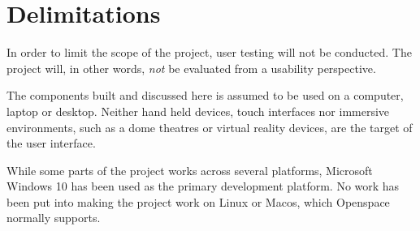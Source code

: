

\section{Delimitations}
\label{sec:delimitations}


In order to limit the scope of the project, user testing will not be conducted. The project will, in other words, \emph{not} be evaluated from a usability perspective.

The components built and discussed here is assumed to be used on a computer, laptop or desktop. Neither hand held devices, touch interfaces nor immersive environments, such as a dome theatres or virtual reality devices, are the target of the user interface.

While some parts of the project works across several platforms, Microsoft Windows 10 has been used as the primary development platform. No work has been put into making the project work on Linux or Macos, which Openspace normally supports.
